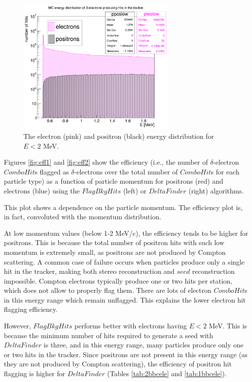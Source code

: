 \begin{figure}[!h]
    \centering
    \includegraphics[width =0.7\textwidth]{figures/png/Screenshot_20240820_154854.png}
    \caption[The electron and positron energy distribution for $E<2$ MeV.]{The electron (pink) and positron (black) 
    energy distribution for $E<2$ MeV.}
    \label{fig:detail}
\end{figure}

Figures \ref{fig:eff1} and \ref{fig:eff2} show the efficiency (i.e., the number of $\delta$-electron 
$ComboHit$s flagged as $\delta$-electrons over the total number of $ComboHit$s 
for each particle type) as a function of particle momentum for positrons (red) 
and electrons (blue) using the $FlagBkgHits$ (left) or $DeltaFinder$ (right) algorithms.

This plot shows a dependence on the particle momentum.
The efficiency plot is, in fact, convoluted with the momentum 
distribution. 

At low momentum values (below 1-2 MeV/c), the efficiency tends to be higher for positrons. 
This is because the total number of positron hits with 
such low momentum is extremely small, as positrons are not produced by  
Compton scattering. A common case of failure occurs when particles produce 
only a single hit in the tracker, making both stereo reconstruction and 
$seed$ reconstruction impossible. Compton electrons typically produce  
one or two hits per station, which does not allow to properly flag them. 
There are lots of electron $ComboHit$s in this energy range which remain 
unflagged. This explains the lower electron hit flagging efficiency.

However, $FlagBkgHits$ performs better with electrons having $E < 2$ MeV. 
This is because the minimum number of hits required to generate a 
seed with $DeltaFinder$ is three, and in this energy range, many 
particles produce only one or two hits in the tracker. Since positrons 
are not present in this energy range (as they are not produced by 
Compton scattering), the efficiency of positron hit flagging is 
higher for $DeltaFinder$ (Tables \ref{tab:2bbcele} and \ref{tab:1bbcele}).

